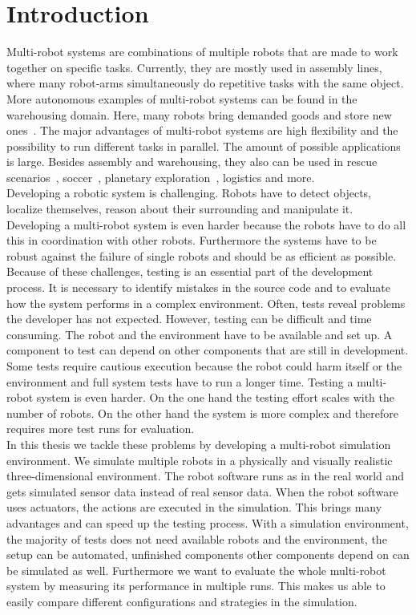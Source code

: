 \chapter{Introduction}

Multi-robot systems are combinations of multiple robots that are made to work together on specific tasks. Currently, they are mostly used in assembly lines, where many robot-arms simultaneously do repetitive tasks with the same object. More autonomous examples of multi-robot systems can be found in the warehousing domain. Here, many robots bring demanded goods and store new ones~\cite{Kiva}. The major advantages of multi-robot systems are high flexibility and the possibility to run different tasks in parallel. The amount of possible applications is large. Besides assembly and warehousing, they also can be used in rescue scenarios~\cite{mas_rescue}, soccer~\cite{mas_soccer}, planetary exploration~\cite{mas_space}, logistics and more.\\
Developing a robotic system is challenging. Robots have to detect objects, localize themselves, reason about their surrounding and manipulate it. Developing a multi-robot system is even harder because the robots have to do all this in coordination with other robots. Furthermore the systems have to be robust against the failure of single robots and should be as efficient as possible. Because of these challenges, testing is an essential part of the development process. It is necessary to identify mistakes in the source code and to evaluate how the system performs in a complex environment. Often, tests reveal problems the developer has not expected. However, testing can be difficult and time consuming. The robot and the environment have to be available and set up. A component to test can depend on other components that are still in development. Some tests require cautious execution because the robot could harm itself or the environment and full system tests have to run a longer time. Testing a multi-robot system is even harder. On the one hand the testing effort scales with the number of robots. On the other hand the system is more complex and therefore requires more test runs for evaluation.\\
In this thesis we tackle these problems by developing a multi-robot simulation environment. We simulate multiple robots in a physically and visually realistic three-dimensional environment. The robot software runs as in the real world and gets simulated sensor data instead of real sensor data. When the robot software uses actuators, the actions are executed in the simulation. This brings many advantages and can speed up the testing process. With a simulation environment, the majority of tests does not need available robots and the environment, the setup can be automated, unfinished components other components depend on can be simulated as well. Furthermore we want to evaluate the whole multi-robot system by measuring its performance in multiple runs. This makes us able to easily compare different configurations and strategies in the simulation.\\
